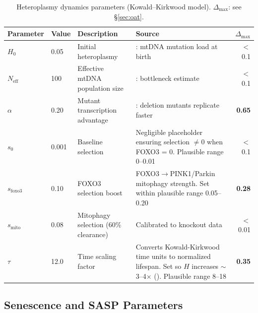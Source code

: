 \documentclass[11pt]{article}
\begin{document}
\begin{table}[H]
\centering
\caption{Heteroplasmy dynamics parameters (Kowald--Kirkwood model). $\Delta_{\max}$: see \S\ref{sec:oat}.}
\begin{tabular}{|ll|p{3cm}|p{6cm}|r|}
\hline
Parameter & Value & Description & Source & $\Delta_{\max}$ \\
\hline
$H_0$ & 0.05 & Initial heteroplasmy & \citet{Stewart2015}: mtDNA mutation load at birth & $<$0.1 \\
\hline
$N_{\text{eff}}$ & 100 & Effective mtDNA population size & \citet{Shoubridge2007}: bottleneck estimate & $<$0.1 \\
\hline
$\alpha$ & 0.20 & Mutant transcription advantage & \citet{Wallace2010}: deletion mutants replicate faster & \textbf{0.65} \\
\hline
$s_0$ & 0.001 & Baseline selection & Negligible placeholder ensuring selection $\neq 0$ when FOXO3 = 0. Plausible range 0--0.01 & $<$0.1 \\
\hline
$s_{\text{foxo3}}$ & 0.10 & FOXO3 selection boost & FOXO3$\to$PINK1/Parkin mitophagy strength. Set within plausible range 0.05--0.20 & \textbf{0.28} \\
\hline
$s_{\text{mito}}$ & 0.08 & Mitophagy selection (60\% clearance) & Calibrated to \citet{Pickrell2015} knockout data & $<$0.01 \\
\hline
$\tau$ & 12.0 & Time scaling factor & Converts Kowald-Kirkwood time units to normalized lifespan. Set so $H$ increases $\sim$3--4$\times$ (\citet{Wallace2010}). Plausible range 8--18 & \textbf{0.35} \\
\hline
\end{tabular}
\end{table}

\subsection{Senescence and SASP Parameters}
\end{document}
